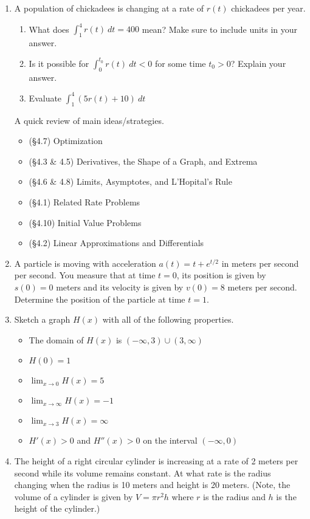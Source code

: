 \documentclass[11pt,fleqn]{article}
\def\ds{\displaystyle}
\begin{document}
\begin{enumerate}
\item A population of chickadees is changing at a rate of $r(t)$ chickadees per year. 
	\begin{enumerate}
	\item What does $\ds{\int_1^4 r(t) \: dt=400}$ mean? Make sure to include units in your answer.\\
	\vfill
	\item Is it possible for $\ds{\int_0^{t_0} r(t) \: dt<0}$ for some time $t_0 >0$? Explain your answer.
	\vfill
	\item Evaluate $\ds{\int_1^4 (5 r(t)+10) \: dt}$
	\vfill
	\end{enumerate}
\newpage
A quick review of main ideas/strategies.
	\begin{itemize}
	\item (\S 4.7) Optimization
	\item (\S 4.3 \& 4.5) Derivatives, the Shape of a Graph, and Extrema
	\item (\S 4.6 \& 4.8) Limits, Asymptotes, and L'Hopital's Rule
	\item (\S 4.1) Related Rate Problems
	\item (\S 4.10) Initial Value Problems
	\item (\S 4.2) Linear Approximations and Differentials  
	\end{itemize}
\item A particle is moving with acceleration $a(t)=t+e^{t/2}$ in meters per second per second. You measure that at time $t=0$, its position is given by $s(0)=0$ meters and its velocity is given by $v(0)=8$ meters per second. Determine the position of the particle at time $t=1.$
\vfill
\item Sketch a graph $H(x)$ with all of the following properties.\\
\begin{itemize}
	\item The domain of $H(x)$ is $(-\infty,3) \cup (3,\infty)$
	\item $H(0)=1$
	\item $\displaystyle \lim_{x \to 0} H(x)=5$
	\item $\displaystyle \lim_{x \to \infty} H(x)=-1$
	\item $\displaystyle \lim_{x \to 3} H(x)=\infty$
	\item $H'(x) >0$ and $H''(x) >0$ on the interval $(-\infty,0)$
\end{itemize}
\newpage
\item The height of a right circular cylinder is increasing at a rate of 2 meters per second while its volume remains constant. At what rate is the radius changing when the radius is 10 meters and height is 20 meters. (Note, the volume of a cylinder is given by $V=\pi r^2 h$ where $r$ is the radius and $h$ is the height of the cylinder.)

\end{enumerate}
\end{document}
